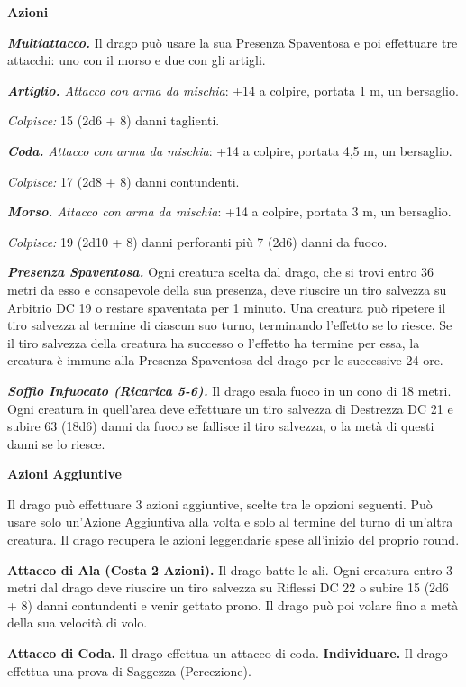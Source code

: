 \begin{multicols}{2}
\smallskip\textbf{Azioni}

\emph{\textbf{Multiattacco.}} Il drago può usare la sua Presenza
Spaventosa e poi effettuare tre attacchi: uno con il morso e due con gli
artigli.

\emph{\textbf{Artiglio.} Attacco con arma da mischia}: +14 a colpire,
portata 1 m, un bersaglio.

\emph{Colpisce:} 15 (2d6 + 8) danni taglienti.

\emph{\textbf{Coda.} Attacco con arma da mischia}: +14 a colpire,
portata 4,5 m, un bersaglio.

\emph{Colpisce:} 17 (2d8 + 8) danni contundenti.

\emph{\textbf{Morso.} Attacco con arma da mischia}: +14 a colpire,
portata 3 m, un bersaglio.

\emph{Colpisce:} 19 (2d10 + 8) danni perforanti più 7 (2d6) danni da
fuoco.

\emph{\textbf{Presenza Spaventosa.}} Ogni creatura scelta dal drago, che
si trovi entro 36 metri da esso e consapevole della sua presenza, deve
riuscire un tiro salvezza su Arbitrio DC 19 o restare spaventata per 1
minuto. Una creatura può ripetere il tiro salvezza al termine di ciascun
suo turno, terminando l'effetto se lo riesce. Se il tiro salvezza della
creatura ha successo o l'effetto ha termine per essa, la creatura è
immune alla Presenza Spaventosa del drago per le successive 24 ore.

\emph{\textbf{Soffio Infuocato (Ricarica 5-6).}} Il drago esala fuoco in
un cono di 18 metri. Ogni creatura in quell'area deve effettuare un tiro
salvezza di Destrezza DC 21 e subire 63 (18d6) danni da fuoco se
fallisce il tiro salvezza, o la metà di questi danni se lo riesce.

\textbf{Azioni Aggiuntive}

Il drago può effettuare 3 azioni aggiuntive, scelte tra le opzioni
seguenti. Può usare solo un'Azione Aggiuntiva alla volta e solo al
termine del turno di un'altra creatura. Il drago recupera le azioni
leggendarie spese all'inizio del proprio round.

\textbf{Attacco di Ala (Costa 2 Azioni).} Il drago batte le ali. Ogni
creatura entro 3 metri dal drago deve riuscire un tiro salvezza su Riflessi DC 22 o subire 15 (2d6 + 8) danni contundenti e venir gettato
prono. Il drago può poi volare fino a metà della sua velocità di volo.

\textbf{Attacco di Coda.} Il drago effettua un attacco di coda.
\textbf{Individuare.} Il drago effettua una prova di Saggezza
(Percezione).




\end{multicols}
